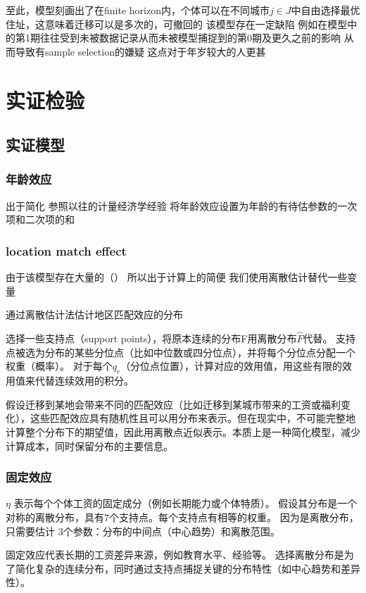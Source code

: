 \documentclass[10pt,a4paper]{article}
\begin{document}
至此，模型刻画出了在finite horizon内，个体可以在不同城市$j\in J$中自由选择最优住址，这意味着迁移可以是多次的，可撤回的
该模型存在一定缺陷
例如在模型中的第1期往往受到未被数据记录从而未被模型捕捉到的第0期及更久之前的影响
从而导致有sample selection的嫌疑
这点对于年岁较大的人更甚


\section{实证检验}

\subsection{实证模型} %
\label{sub:实证模型}
\subsubsection{年龄效应}
出于简化
参照以往的计量经济学经验
将年龄效应设置为年龄的有待估参数的一次项和二次项的和

\subsubsection{location match effect}
由于该模型存在大量的（）
所以出于计算上的简便
我们使用离散估计替代一些变量

通过离散估计法估计地区匹配效应的分布

选择一些支持点（support points），将原本连续的分布F用离散分布$\hat F$代替。
支持点被选为分布的某些分位点（比如中位数或四分位点），并将每个分位点分配一个权重（概率）。
对于每个$q_r$（分位点位置），计算对应的效用值，用这些有限的效用值来代替连续效用的积分。

假设迁移到某地会带来不同的匹配效应（比如迁移到某城市带来的工资或福利变化），这些匹配效应具有随机性且可以用分布来表示。但在现实中，不可能完整地计算整个分布下的期望值，因此用离散点近似表示。本质上是一种简化模型，减少计算成本，同时保留分布的主要信息。

\subsubsection{固定效应}


$\eta$ 表示每个个体工资的固定成分（例如长期能力或个体特质）。
假设其分布是一个对称的离散分布，具有7个支持点。每个支持点有相等的权重。
因为是离散分布，只需要估计 3个参数：分布的中间点（中心趋势）和离散范围。

固定效应代表长期的工资差异来源，例如教育水平、经验等。
选择离散分布是为了简化复杂的连续分布，同时通过支持点捕捉关键的分布特性（如中心趋势和差异性）。
\end{document}

